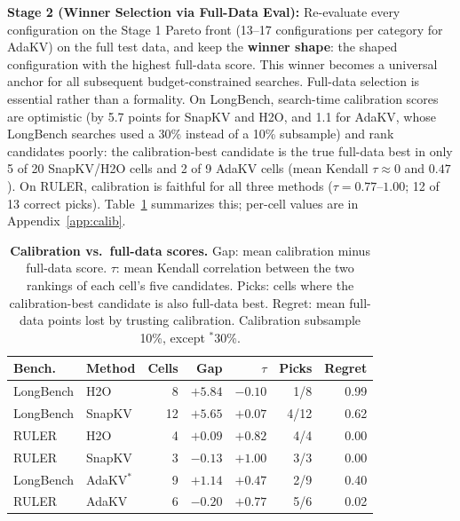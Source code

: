 \documentclass[11pt]{article}
\begin{document}
\textbf{Stage 2 (Winner Selection via Full-Data Eval):} Re-evaluate every configuration on the Stage 1 Pareto front (13--17 configurations per category for AdaKV) on the full test data, and keep the \textbf{winner shape}: the shaped configuration with the highest full-data score. This winner becomes a universal anchor for all subsequent budget-constrained searches. Full-data selection is essential rather than a formality. On LongBench, search-time calibration scores are optimistic (by 5.7 points for SnapKV and H2O, and 1.1 for AdaKV, whose LongBench searches used a 30\% instead of a 10\% subsample) and rank candidates poorly: the calibration-best candidate is the true full-data best in only 5 of 20 SnapKV/H2O cells and 2 of 9 AdaKV cells (mean Kendall $\tau \approx 0$ and $0.47$). On RULER, calibration is faithful for all three methods ($\tau = 0.77$--$1.00$; 12 of 13 correct picks). Table~\ref{tab:calib} summarizes this; per-cell values are in Appendix~\ref{app:calib}.

\begin{table}[htbp]
  \centering
  \footnotesize
  \setlength{\tabcolsep}{2.5pt}
  \begin{tabular}{@{} l l r r r r r @{}}
    \toprule
    \textbf{Bench.} & \textbf{Method} & \textbf{Cells} & \textbf{Gap} & \textbf{$\tau$} & \textbf{Picks} & \textbf{Regret} \\
    \midrule
    \rowcolor{gray!10}
    LongBench & H2O    & 8  & $+5.84$ & $-0.10$ & 1/8  & 0.99 \\
    LongBench & SnapKV & 12 & $+5.65$ & $+0.07$ & 4/12 & 0.62 \\
    \rowcolor{gray!10}
    RULER     & H2O    & 4  & $+0.09$ & $+0.82$ & 4/4  & 0.00 \\
    RULER     & SnapKV & 3  & $-0.13$ & $+1.00$ & 3/3  & 0.00 \\
    \midrule
    \rowcolor{gray!10}
    LongBench & AdaKV$^\ast$ & 9 & $+1.14$ & $+0.47$ & 2/9 & 0.40 \\
    RULER     & AdaKV  & 6  & $-0.20$ & $+0.77$ & 5/6  & 0.02 \\
    \bottomrule
  \end{tabular}
  \caption{\textbf{Calibration vs.\ full-data scores.} Gap: mean calibration minus full-data score. $\tau$: mean Kendall correlation between the two rankings of each cell's five candidates. Picks: cells where the calibration-best candidate is also full-data best. Regret: mean full-data points lost by trusting calibration. Calibration subsample 10\%, except $^\ast$30\%.}
  \label{tab:calib}
\end{table}
\end{document}
